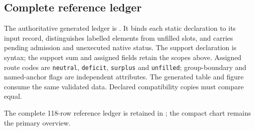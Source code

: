 
\subsection{Complete reference ledger}\label{subsec:complete-elemental-ledger}
The authoritative generated ledger is . It binds each static declaration to its input record, distinguishes labelled elements from unfilled slots, and carries pending admission and unexecuted native status. The support declaration is syntax; the support sum and assigned fields retain the scopes above. Assigned route codes are \texttt{neutral}, \texttt{deficit}, \texttt{surplus} and \texttt{unfilled}; group-boundary and named-anchor flags are independent attributes. The generated table and figure consume the same validated data. Declared compatibility copies must compare equal.

The complete 118-row reference ledger is retained in ; the compact chart remains the primary overview.
